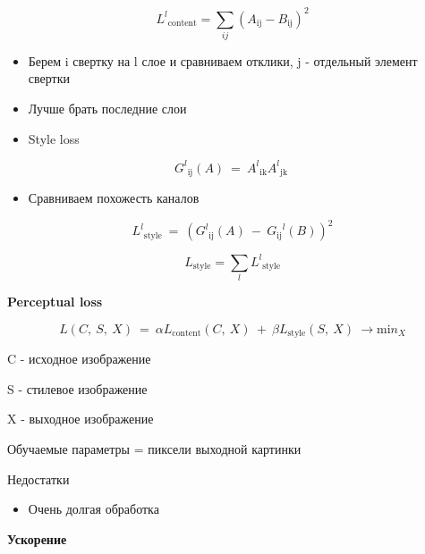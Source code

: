 \documentclass[a4paper, 12pt]{article}
\begin{document}
\[{L^{l}}_{\text{content}} = \sum_{ij} (A_{\text{ij}} - B_{\text{ij}})^{2}\]


\begin{itemize}
\item
  
  Берем i свертку на l слое и сравниваем отклики, j - отдельный элемент
  свертки
  
\end{itemize}

\begin{itemize}
\item
  
  Лучше брать последние слои
  
\item
  
  {Style loss}
  
\end{itemize}

\[{G^{l}}_{\text{ij}}(A)\  = \ {A^{l}}_{\text{ik}}{A^{l}}_{\text{jk}}\ \]

\begin{itemize}
\item
  
  Сравниваем похожесть каналов
  
\end{itemize}

\[{L^{l}}_{\text{style}}\  = \ ({G^{l}}_{\text{ij}}(A)\  - \ {G_{\text{ij}}}^{l}(B))^{2}\]

\[L_{\text{style}} = \sum_{l} {L^{l}}_{\text{style}}\]

\textbf{{Perceptual loss}}

\[L(C,\ S,\ X)\  = \ \alpha L_{\text{content}}(C,\ X)\  + \ \beta L_{\text{style}}(S,\ X)\  \rightarrow \text{mi}n_{X}\]

C - исходное изображение

S - стилевое изображение

X - выходное изображение

{Обучаемые параметры = пиксели выходной картинки}

{Недостатки}

\begin{itemize}
\item
  
  Очень долгая обработка
  
\end{itemize}

\textbf{Ускорение}
\end{document}
